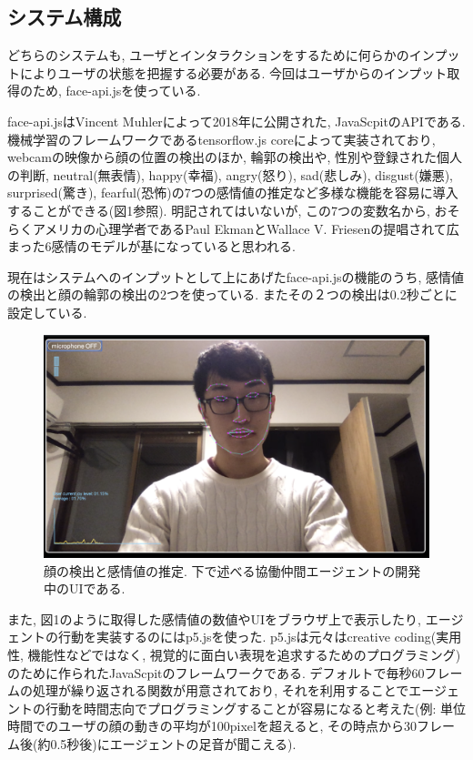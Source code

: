 \documentclass[a4paper,dvipdfmx]{hisken}
\begin{document}
\subsection{システム構成}
どちらのシステムも, ユーザとインタラクションをするために何らかのインプットによりユーザの状態を把握する必要がある. 今回はユーザからのインプット取得のため, face-api.jsを使っている. 

face-api.jsはVincent Muhlerによって2018年に公開された, JavaScpitのAPIである. 機械学習のフレームワークであるtensorflow.js coreによって実装されており, webcamの映像から顔の位置の検出のほか, 輪郭の検出や, 性別や登録された個人の判断, neutral(無表情), happy(幸福), angry(怒り), sad(悲しみ), disgust(嫌悪), surprised(驚き), fearful(恐怖)の7つの感情値の推定など多様な機能を容易に導入することができる(図1参照). 明記されてはいないが, この7つの変数名から, おそらくアメリカの心理学者であるPaul EkmanとWallace V. Friesenの提唱されて広まった6感情のモデルが基になっていると思われる.

現在はシステムへのインプットとして上にあげたface-api.jsの機能のうち, 感情値の検出と顔の輪郭の検出の2つを使っている. またその２つの検出は0.2秒ごとに設定している.

\begin{figure}
  \includegraphics[width=\linewidth]{detection00.png}
  \caption{顔の検出と感情値の推定. 下で述べる協働仲間エージェントの開発中のUIである.}
  \label{fig:detection}
\end{figure}

また, 図1のように取得した感情値の数値やUIをブラウザ上で表示したり, エージェントの行動を実装するのにはp5.jsを使った. p5.jsは元々はcreative coding(実用性, 機能性などではなく, 視覚的に面白い表現を追求するためのプログラミング)のために作られたJavaScpitのフレームワークである. デフォルトで毎秒60フレームの処理が繰り返される関数が用意されており, それを利用することでエージェントの行動を時間志向でプログラミングすることが容易になると考えた(例: 単位時間でのユーザの顔の動きの平均が100pixelを超えると, その時点から30フレーム後(約0.5秒後)にエージェントの足音が聞こえる). 
\end{document}
